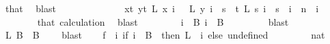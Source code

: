 \begin{isabellebody}
\ that\ \isamarkupfalse%
\ blast\isanewline
\ \ \isacommand{{\isacharbraceright}{\kern0pt}}\isamarkupfalse%
\isanewline
\ \ \isamarkupfalse%
\isanewline
\ \ \isacommand{{\isacharbraceleft}{\kern0pt}}\isamarkupfalse%
\isanewline
\ \ \ \ \isamarkupfalse%
\ {\isachardoublequoteopen}{\isacharparenleft}{\kern0pt}{\isasymforall}x{\isacharless}{\kern0pt}t{\isachardot}{\kern0pt}\ {\isasymforall}y{\isacharless}{\kern0pt}t{\isachardot}{\kern0pt}\ L\ x\ i\ {\isacharequal}{\kern0pt}\ \ L\ y\ i{\isacharparenright}{\kern0pt}\ {\isasymlongrightarrow}\ {\isasymnot}{\isacharparenleft}{\kern0pt}{\isasymforall}s\ {\isacharless}{\kern0pt}\ t{\isachardot}{\kern0pt}\ L\ s\ i\ {\isacharequal}{\kern0pt}\ s{\isacharparenright}{\kern0pt}{\isachardoublequoteclose}\ \ {\isachardoublequoteopen}i\ {\isacharless}{\kern0pt}\ n{\isachardoublequoteclose}\ \ i\isanewline
\ \ \ \ \ \ \isamarkupfalse%
\ that\ calculation\ \isamarkupfalse%
\ blast\isanewline
\ \ \ \ \isamarkupfalse%
\ \isamarkupfalse%
\ {\isacharasterisk}{\kern0pt}{\isacharasterisk}{\kern0pt}{\isacharcolon}{\kern0pt}\ {\isachardoublequoteopen}{\isasymforall}i\ {\isasymin}\ {\isacharquery}{\kern0pt}B{}{\isachardot}{\kern0pt}\ i\ {\isasymnotin}\ {\isacharquery}{\kern0pt}B{}{\isachardoublequoteclose}\ \isanewline
\ \ \ \ \ \ \isamarkupfalse%
\ blast\isanewline
\ \ \isacommand{{\isacharbraceright}{\kern0pt}}\isamarkupfalse%
\isanewline
\ \ \isamarkupfalse%
\ \isamarkupfalse%
\ L{}{\isacharcolon}{\kern0pt}\ {\isachardoublequoteopen}{\isacharquery}{\kern0pt}B{}\ {\isasyminter}\ {\isacharquery}{\kern0pt}B{}\ {\isacharequal}{\kern0pt}\ {\isacharbraceleft}{\kern0pt}{\isacharbraceright}{\kern0pt}{\isachardoublequoteclose}\ \isamarkupfalse%
\ blast\isanewline
\isanewline
\ \ \isamarkupfalse%
\ {\isacharquery}{\kern0pt}f\ {\isacharequal}{\kern0pt}\ {\isachardoublequoteopen}{\isacharparenleft}{\kern0pt}{\isasymlambda}i{\isachardot}{\kern0pt}\ if\ i\ {\isasymin}\ B\ {}\ then\ L\ {}\ i\ else\ undefined{\isacharparenright}{\kern0pt}{\isachardoublequoteclose}\isanewline
\ \ \isacommand{{\isacharbraceleft}{\kern0pt}}\isamarkupfalse%
\isanewline
\ \ \ \ \isamarkupfalse%
\ {\isachardoublequoteopen}{\isacharbraceleft}{\kern0pt}{\isachardot}{\kern0pt}{\isachardot}{\kern0pt}{}{\isacharcolon}{\kern0pt}{\isacharcolon}{\kern0pt}nat{\isacharbraceright}{\kern0pt}\ {\isacharequal}{\kern0pt}\ {\isacharbraceleft}{\kern0pt}{}{\isacharcomma}{\kern0pt}\ {}{\isacharbraceright}{\kern0pt}{\isachardoublequoteclose}\ \isamarkupfalse%

\end{isabellebody}
